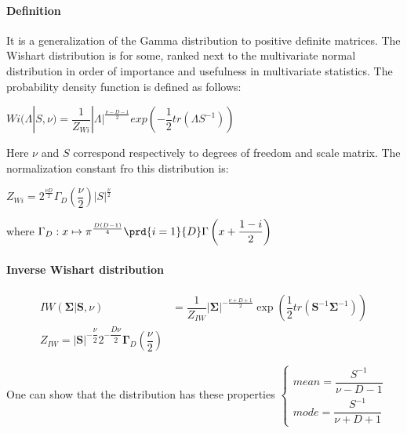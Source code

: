 \paragraph{Definition}
It is a generalization of the Gamma distribution to positive definite matrices.
The Wishart distribution is for some, ranked next to the multivariate normal distribution
in order of importance and usefulness in multivariate statistics.
The probability density function is defined as follows:
\begin{center}
    $Wi(\Lambda|S,\nu) = \dfrac{1}{Z_{Wi}}|\Lambda|^{\frac{\nu-D-1}{2}}exp\left(
    -\dfrac{1}{2}tr(\Lambda S^{-1})\right)$
\end{center}
Here $\nu$ and $S$ correspond respectively to degrees of freedom and scale matrix.
The normalization constant fro this distribution is:
\begin{center}
    $Z_{Wi} = 2^{\frac{\nu D}{2}}\Gamma_{D}\left(\dfrac{\nu}{2}\right)|S|^{\frac{\nu}{2}}$
\end{center}
where $\Gamma_{D}: x\mapsto \pi^{\frac{D(D-1)}{4}}\prd{i=1}{D}\Gamma\left(x+\dfrac{1-i}
    {2}\right)$

\paragraph{Inverse Wishart distribution}
\begin{align*}
    IW(\bm{\Sigma}|\bm{S}, \nu) &= \dfrac{1}{Z_{IW}}|\bm{\Sigma}|^{-\frac{\nu + D + 1}{2}}
    \exp\left(\dfrac{1}{2}tr(\bm{S}^{-1}\bm{\Sigma}^{-1})\right)\\
    Z_{IW} = |\bm{S}|^{-\dfrac{\nu}{2}}2^{-\dfrac{D\nu}{2}}\bm{\Gamma}_{D}(\dfrac{\nu}{2})
\end{align*}

One can show that the distribution has these properties
$\begin{cases}
    mean = \dfrac{S^{-1}}{\nu - D - 1}\\
    mode = \dfrac{S^{-1}}{\nu + D + 1}
\end{cases}$
